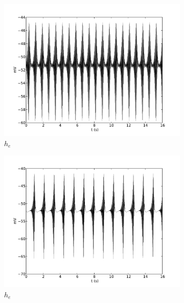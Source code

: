\documentclass[a4paper,12pt]{article}
\begin{document}
\begin{figure}
\begin{subfigure}[b]{0.5\textwidth}
		\includegraphics[scale=0.35]{frontiers-2012-images-revised/effect_gamma_ee_yml-00493_ode-burst-psp-res_yml-mod-res-3-2-1-1_yml-he-intra.pdf}
		\caption{$h_e$}
	\end{subfigure}
	\begin{subfigure}[b]{0.5\textwidth}
		\includegraphics[scale=0.35]{frontiers-2012-images-revised/effect_gamma_ee_yml-00493_ode-burst-psp-res_yml-mod-res-3-3-1-1_yml-he-intra.pdf}
		\caption{$h_e$}
	\end{subfigure}
	\begin{subfigure}[b]{0.5\textwidth}

\end{subfigure}
\end{figure}
\end{document}
